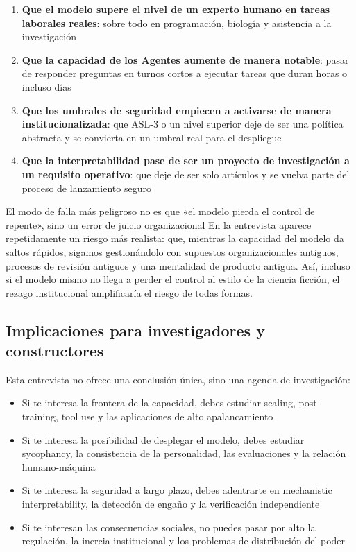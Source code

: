 \begin{enumerate}
    \item \textbf{Que el modelo supere el nivel de un experto humano en tareas laborales reales}: sobre todo en programación, biología y asistencia a la investigación
    \item \textbf{Que la capacidad de los Agentes aumente de manera notable}: pasar de responder preguntas en turnos cortos a ejecutar tareas que duran horas o incluso días
    \item \textbf{Que los umbrales de seguridad empiecen a activarse de manera institucionalizada}: que ASL-3 o un nivel superior deje de ser una política abstracta y se convierta en un umbral real para el despliegue
    \item \textbf{Que la interpretabilidad pase de ser un proyecto de investigación a un requisito operativo}: que deje de ser solo artículos y se vuelva parte del proceso de lanzamiento seguro
\end{enumerate}

\begin{warningbox}{El modo de falla más peligroso no es que «el modelo pierda el control de repente», sino un error de juicio organizacional}
En la entrevista aparece repetidamente un riesgo más realista: que, mientras la capacidad del modelo da saltos rápidos, sigamos gestionándolo con supuestos organizacionales antiguos, procesos de revisión antiguos y una mentalidad de producto antigua. Así, incluso si el modelo mismo no llega a perder el control al estilo de la ciencia ficción, el rezago institucional amplificaría el riesgo de todas formas.
\end{warningbox}

\subsection{Implicaciones para investigadores y constructores}

Esta entrevista no ofrece una conclusión única, sino una agenda de investigación:

\begin{itemize}
    \item Si te interesa la frontera de la capacidad, debes estudiar scaling, post-training, tool use y las aplicaciones de alto apalancamiento
    \item Si te interesa la posibilidad de desplegar el modelo, debes estudiar sycophancy, la consistencia de la personalidad, las evaluaciones y la relación humano-máquina
    \item Si te interesa la seguridad a largo plazo, debes adentrarte en mechanistic interpretability, la detección de engaño y la verificación independiente
    \item Si te interesan las consecuencias sociales, no puedes pasar por alto la regulación, la inercia institucional y los problemas de distribución del poder
\end{itemize}

